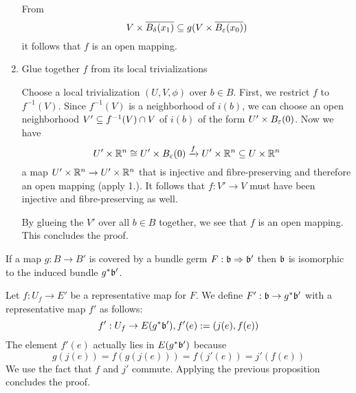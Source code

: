 \begin{myproof}
\begin{enumerate}
        From
        \[ V \times \clball[\delta][x_1] \sub g(V \times \clball[\varepsilon][x_0]) \]
        it follows that $f$ is an open mapping.

        \item
        Glue together $f$ from its local trivializations

        Choose a local trivialization $(U, V, \phi)$ over $b \in B$.
        First, we restrict $f$ to $f^{-1}(V)$.
        Since $f^{-1}(V)$ is a neighborhood of $i(b)$, we can choose an open neighborhood $V' \subseteq{} f^{-1}(V) \cap V$ of $i(b)$ of the form $U' \times \ball[\varepsilon]$.
        Now we have
        \[ U' \times \R^n \cong U' \times \ball[\varepsilon] \xto{f} U' \times \R^n \sub U \times \R^n \]
        a map $U' \times \mathbb{R}^n \to U' \times \mathbb{R}^n$ that is injective and fibre-preserving and therefore an open mapping (apply 1.).
        It follows that $f: V' \to V$ must have been injective and fibre-preserving as well.

        By glueing the $V'$ over all $b \in B$ together, we see that $f$ is an open mapping.
        This concludes the proof.
    \end{enumerate}
\end{myproof}

\begin{mycorollary}
    If a map $g: B \to B'$ is covered by a bundle germ $F: \mathfrak{b} \Rightarrow \mathfrak{b}'$ then $\mathfrak{b}$ is isomorphic to the induced bundle $g^*\mathfrak{b}'$.
\end{mycorollary}
\begin{myproof}
    Let $f: U_f \to E'$ be a representative map for $F$.
    We define $F': \mathfrak{b} \to g^*\mathfrak{b}'$ with a representative map $f'$ as follows:
    \[ f': U_f \to E(g^*\mathfrak{b}'), f'(e) := (j(e), f(e)) \]
    The element $f'(e)$ actually lies in $E(g^*\mathfrak{b}')$ because
    \[ g(j(e)) = f(g(j(e))) = f(j'(e)) = j'(f(e)) \]
    We use the fact that $f$ and $j'$ commute.
    Applying the previous proposition concludes the proof.
\end{myproof}